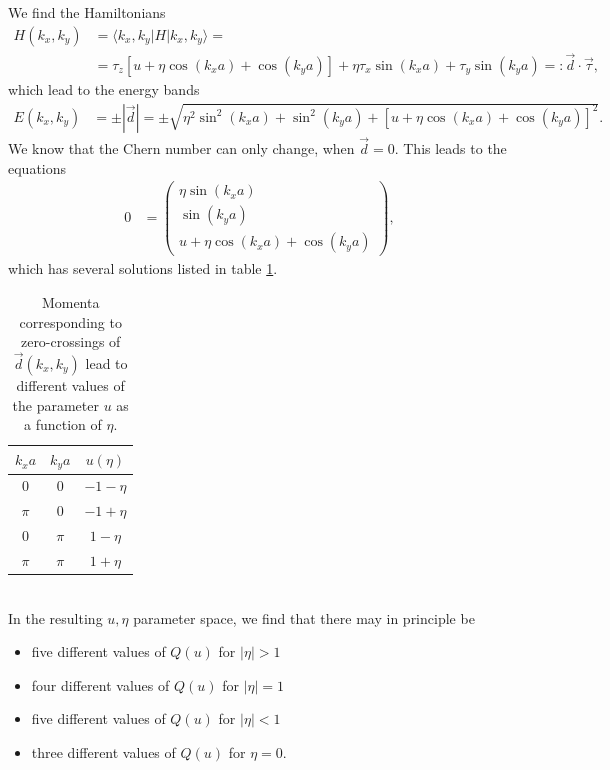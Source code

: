 \documentclass[english, parskip=full]{scrartcl}
\newcommand{\braket}{}
\newcommand{\klam}{}
\begin{document}
We find the Hamiltonians 
\begin{align}
H(k_x,k_y) &= \braket\langle k_x,k_y | H | k_x,k_y \rangle = \\
&= \tau_z\klam\left[ u + \eta\cos(k_xa) + \cos(k_ya) \right] + \eta\tau_x\sin(k_xa) + \tau_y\sin(k_ya) =: \vec{d}\cdot\vec{\tau},
\end{align}
which lead to the energy bands
\begin{align}
E(k_x,k_y) &= \pm |\vec{d}| = \pm \sqrt{\eta^2\sin^2(k_xa) + \sin^2(k_ya) + \klam\left[ u + \eta\cos(k_xa) + \cos(k_ya) \right]^2}.
\end{align}
We know that the Chern number can only change, when $\vec{d}=0$.
This leads to the equations
\begin{align}
0 &= \begin{pmatrix}
\eta\sin(k_xa) \\ \sin(k_ya) \\ u + \eta\cos(k_xa) + \cos(k_ya)
\end{pmatrix},
\end{align}
which has several solutions listed in table \ref{table:chern d vec zero crossings}.
\begin{table}[!ht]
\centering
\begin{tabular}{c|c||c}
$k_xa$ & $k_ya$ & $u(\eta)$ \\ \hline
0 & 0 & $-1-\eta$ \\ \hline
$\pi$ & 0 & $-1+\eta$ \\ \hline
0 & $\pi$ & $1-\eta$ \\ \hline
$\pi$ & $\pi$ & $1+\eta$ \\
\end{tabular}
\caption{Momenta corresponding to zero-crossings of $\vec{d}(k_x,k_y)$ lead to different values of the parameter $u$ as a function of $\eta$.}
\label{table:chern d vec zero crossings}
\end{table}
\\
In the resulting $u,\eta$ parameter space, we find that there may in principle be
\begin{itemize}
\item[1)] five different values of $Q(u)$ for $|\eta| > 1$
\item[2)] four different values of $Q(u)$ for $|\eta| = 1$
\item[3)] five different values of $Q(u)$ for $|\eta| < 1$
\item[4)] three different values of $Q(u)$ for $\eta = 0$.
\end{itemize}
\end{document}
